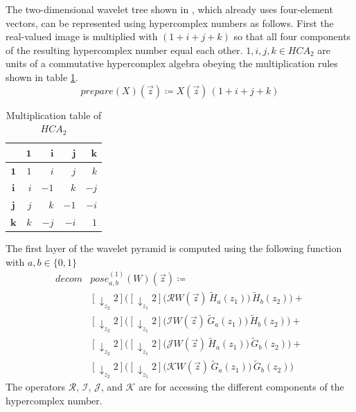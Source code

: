 \documentclass[a4paper,12pt]{book}
\begin{document}
The two-dimensional wavelet tree shown in \cite{RefWorks:385}, which already
uses four-element vectors, can be represented using hypercomplex numbers as
follows.
First the real-valued image is multiplied with $(1+i+j+k)$ so that all
four components of the resulting hypercomplex number equal each other.
$1,i,j,k\in HCA_2$ are units of a commutative hypercomplex algebra obeying the
multiplication rules shown in table \ref{tbl:hca}.
\begin{equation}
  prepare(X)(\vec{z})\coloneqq X(\vec{z})\,(1+i+j+k)
\end{equation}
\begin{table}[tbhp]
  \begin{center}
    \caption{Multiplication table of $HCA_2$\label{tbl:hca}}
    \begin{tabular}{crrrr}\toprule
      &  $\mathbf{1}$ & $\mathbf{i}$ &  $\mathbf{j}$ &  $\mathbf{k}$ \\\midrule
      $\mathbf{1}$ &  $1$ &  $i$ &  $j$ &  $k$ \\
      $\mathbf{i}$ &  $i$ & $-1$ &  $k$ & $-j$ \\
      $\mathbf{j}$ &  $j$ &  $k$ & $-1$ & $-i$ \\
      $\mathbf{k}$ &  $k$ & $-j$ & $-i$ &  $1$ \\\bottomrule
    \end{tabular}
  \end{center}
\end{table}
The first layer of the wavelet pyramid is computed using the following
function with $a,b\in\{0,1\}$
\begin{equation}
  \begin{split}
    decom&pose^{(1)}_{a,b}(W)(\vec{z})\coloneqq\\
    &[\downarrow_{z_2}2]\Big([\downarrow_{z_1}2]\big(\mathcal{R}W(\vec{z})\,\widetilde{H}_a(z_1)\big)\,\widetilde{H}_b(z_2)\Big)+\\
    &[\downarrow_{z_2}2]\Big([\downarrow_{z_1}2]\big(\mathcal{I}W(\vec{z})\,\widetilde{G}_a(z_1)\big)\,\widetilde{H}_b(z_2)\Big)+\\
    &[\downarrow_{z_2}2]\Big([\downarrow_{z_1}2]\big(\mathcal{J}W(\vec{z})\,\widetilde{H}_a(z_1)\big)\,\widetilde{G}_b(z_2)\Big)+\\
    &[\downarrow_{z_2}2]\Big([\downarrow_{z_1}2]\big(\mathcal{K}W(\vec{z})\,\widetilde{G}_a(z_1)\big)\,\widetilde{G}_b(z_2)\Big)
  \end{split}
\end{equation}
The operators $\mathcal{R}$, $\mathcal{I}$, $\mathcal{J}$, and $\mathcal{K}$
are for accessing the different components of the hypercomplex number.
\end{document}
